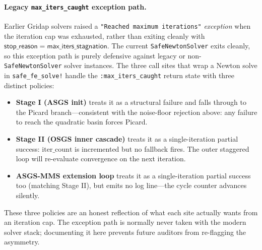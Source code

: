 \documentclass{article}
\newcommand{\code}[1]{\texttt{\small #1}}
\begin{document}
\paragraph{Legacy \texttt{max\_iters\_caught} exception path.}  Earlier
Gridap solvers raised a \texttt{"Reached maximum iterations"}
\emph{exception} when the iteration cap was exhausted, rather than
exiting cleanly with $\mathsf{stop\_reason} = \mathsf{max\_iters\_stagnation}$.
The current \code{SafeNewtonSolver} exits cleanly, so this exception
path is purely defensive against legacy or non-\code{SafeNewtonSolver}
solver instances. The three call sites that wrap a Newton solve in
\code{safe\_fe\_solve!} handle the \code{:max\_iters\_caught} return
state with three distinct policies:
\begin{itemize}\itemsep0pt
\item \textbf{Stage I (ASGS init)} treats it as a structural failure
  and falls through to the Picard branch---consistent with the noise-floor
  rejection above: any failure to reach the quadratic basin forces
  Picard.
\item \textbf{Stage II (OSGS inner cascade)} treats it as a
  single-iteration partial success: $\mathrm{iter\_count}$ is
  incremented but no fallback fires. The outer staggered loop will
  re-evaluate convergence on the next iteration.
\item \textbf{ASGS-MMS extension loop} treats it as a single-iteration
  partial success too (matching Stage II), but emits no log line---the
  cycle counter advances silently.
\end{itemize}
These three policies are an honest reflection of what each site
actually wants from an iteration cap. The exception path is normally
never taken with the modern solver stack; documenting it here prevents
future auditors from re-flagging the asymmetry.
\end{document}
